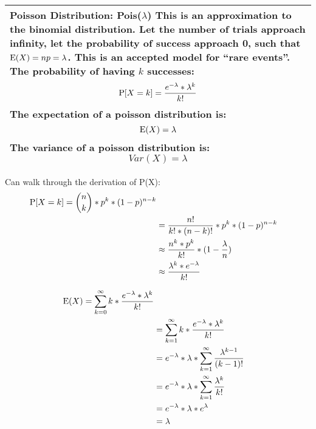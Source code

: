 {\tabulinesep=1mm
\begin{tabu}{|p{16cm} |}
\hline
\vspace{2 mm}
\textbf{Poisson Distribution: Pois($\lambda$)}
This is an approximation to the binomial distribution. Let the number 
of trials approach infinity, let the probability of success approach 0, 
such that $\E(X) = np = \lambda$.  This is an accepted model for 
“rare events”. The probability of having $k$ successes:
\[ \P[X = k] = \frac{e^{-\lambda} * \lambda^k}{k!} \]
The expectation of a poisson distribution is:
\[ \E(X) = \lambda \]
The variance of a poisson distribution is:
\[ Var(X) = \lambda \]
\vspace{5 mm}
\\
\hline
\end{tabu}
}

\begin{solution} %
Can walk through the derivation of P(X):
\begin{equation}
\begin{split}
\P[X = k] = {n \choose k} * p^k * (1 - p)^{n - k} \\ \nonumber
&= \frac{n!}{k! * (n - k)!} * p^k * (1 - p)^{n - k} \\
&\approx \frac{n^k * p^k}{k!} * (1 - \frac{\lambda}{n}) \\
&\approx \frac{\lambda^k * e^{-\lambda}}{k!}
\end{split}
\end{equation}

\begin{equation}
\begin{split}
\E(X) = \sum_{k = 0}^{\infty} k* \frac{e^{-\lambda} * \lambda^k}{k!} \\ \nonumber
&= \sum_{k = 1}^{\infty}k * \frac{e^{-\lambda} * \lambda^k}{k!} \\
&= e^{-\lambda} * \lambda * \sum_{k = 1}^{\infty} \frac{\lambda^{k - 1}}{(k - 1)!} \\
&=  e^{-\lambda} * \lambda * \sum_{k = 1}^{\infty} \frac{\lambda^{k}}{k!} \\
&= e^{-\lambda} * \lambda * e^{\lambda} \\
&= \lambda 
\end{split}
\end{equation}

\end{solution}
